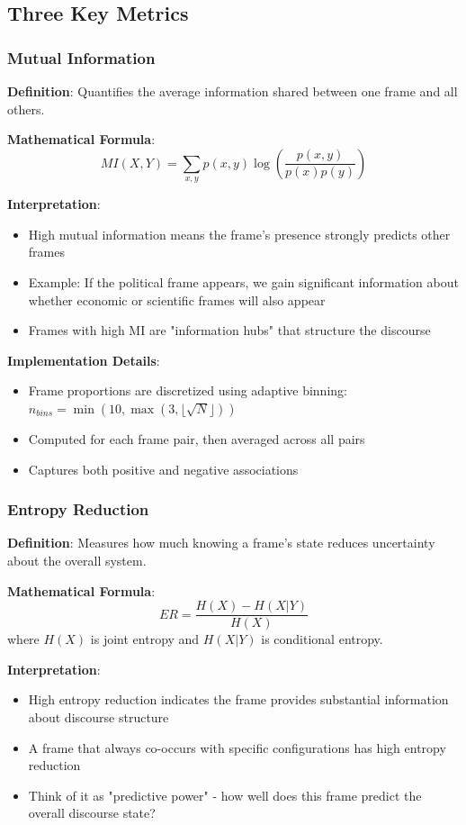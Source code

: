 \documentclass[11pt]{article}
\begin{document}
\subsection{Three Key Metrics}

\subsubsection{Mutual Information}
\textbf{Definition}: Quantifies the average information shared between one frame and all others.

\textbf{Mathematical Formula}:
$$MI(X,Y) = \sum_{x,y} p(x,y) \log\left(\frac{p(x,y)}{p(x)p(y)}\right)$$

\textbf{Interpretation}: 
\begin{itemize}
    \item High mutual information means the frame's presence strongly predicts other frames
    \item Example: If the political frame appears, we gain significant information about whether economic or scientific frames will also appear
    \item Frames with high MI are "information hubs" that structure the discourse
\end{itemize}

\textbf{Implementation Details}:
\begin{itemize}
    \item Frame proportions are discretized using adaptive binning: $n_{bins} = \min(10, \max(3, \lfloor\sqrt{N}\rfloor))$
    \item Computed for each frame pair, then averaged across all pairs
    \item Captures both positive and negative associations
\end{itemize}

\subsubsection{Entropy Reduction}
\textbf{Definition}: Measures how much knowing a frame's state reduces uncertainty about the overall system.

\textbf{Mathematical Formula}:
$$ER = \frac{H(X) - H(X|Y)}{H(X)}$$
where $H(X)$ is joint entropy and $H(X|Y)$ is conditional entropy.

\textbf{Interpretation}:
\begin{itemize}
    \item High entropy reduction indicates the frame provides substantial information about discourse structure
    \item A frame that always co-occurs with specific configurations has high entropy reduction
    \item Think of it as "predictive power" - how well does this frame predict the overall discourse state?
\end{itemize}
\end{document}
